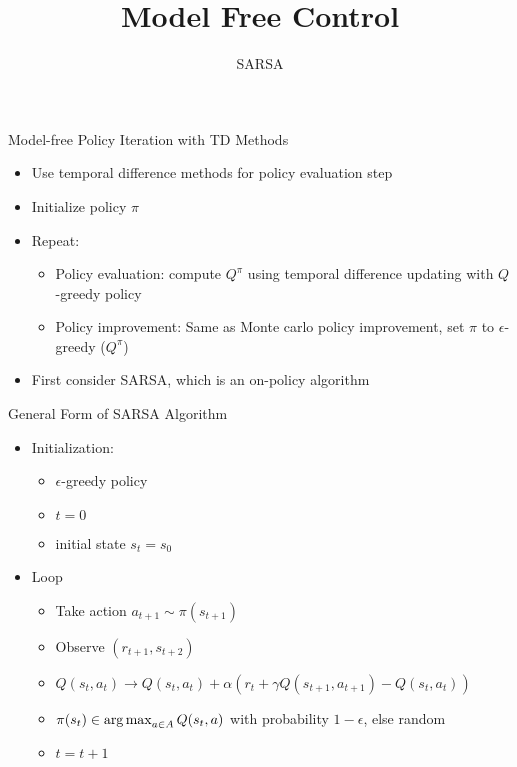 


\title[Reinforcement Learning: Model Free Control]{Model Free Control}
\subtitle{SARSA}




	
	\maketitle

\begin{frame}[c]{Model-free Policy Iteration with TD Methods}
	
	\begin{itemize}
		\item Use temporal difference methods for policy evaluation step
		\item Initialize policy $\pi$
		\item Repeat:
		\begin{itemize}
			\item Policy evaluation: compute $Q^\pi$ using temporal difference updating
			with $Q$-greedy policy
			\item Policy improvement: Same as Monte carlo policy improvement, set $\pi$
			to $\epsilon$-greedy ($Q^\pi$)
		\end{itemize}
		\item First consider SARSA, which is an on-policy algorithm
	\end{itemize}
	
\end{frame}
\begin{frame}[c]{General Form of SARSA Algorithm}
	
	\begin{itemize}
		\item Initialization:
		\begin{itemize}
			\item $\epsilon$-greedy policy 
			\item $t=0$
			\item initial state $s_t = s_0$
		\end{itemize} 
		\item Loop
		\begin{itemize}
			\item Take action $a_{t+1} \sim \pi(s_{t+1})$
			\item Observe $(r_{t+1}, s_{t+2})$
			\item $Q(s_t,a_t) \to Q(s_t, a_t) + \alpha (r_t + \gamma Q(s_{t+1}, a_{t+1}) - Q(s_t, a_t))$
			\item $\pi(s_t) \in \operatorname*{arg\,max}_{a\in A} Q(s_t, a)$ with probability $1-\epsilon$, else random
			\item $t = t+1$
		\end{itemize} 
	\end{itemize}
	
\end{frame}

